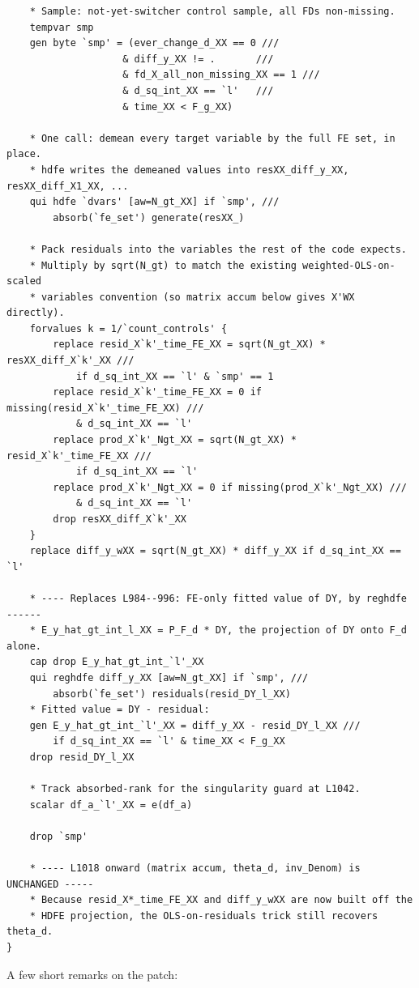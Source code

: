 \documentclass[11pt]{article}
\newcommand{\1}{\mathbb{1}}
\begin{document}
\begin{lstlisting}
    * Sample: not-yet-switcher control sample, all FDs non-missing.
    tempvar smp
    gen byte `smp' = (ever_change_d_XX == 0 ///
                    & diff_y_XX != .       ///
                    & fd_X_all_non_missing_XX == 1 ///
                    & d_sq_int_XX == `l'   ///
                    & time_XX < F_g_XX)

    * One call: demean every target variable by the full FE set, in place.
    * hdfe writes the demeaned values into resXX_diff_y_XX, resXX_diff_X1_XX, ...
    qui hdfe `dvars' [aw=N_gt_XX] if `smp', ///
        absorb(`fe_set') generate(resXX_)

    * Pack residuals into the variables the rest of the code expects.
    * Multiply by sqrt(N_gt) to match the existing weighted-OLS-on-scaled
    * variables convention (so matrix accum below gives X'WX directly).
    forvalues k = 1/`count_controls' {
        replace resid_X`k'_time_FE_XX = sqrt(N_gt_XX) * resXX_diff_X`k'_XX ///
            if d_sq_int_XX == `l' & `smp' == 1
        replace resid_X`k'_time_FE_XX = 0 if missing(resid_X`k'_time_FE_XX) ///
            & d_sq_int_XX == `l'
        replace prod_X`k'_Ngt_XX = sqrt(N_gt_XX) * resid_X`k'_time_FE_XX ///
            if d_sq_int_XX == `l'
        replace prod_X`k'_Ngt_XX = 0 if missing(prod_X`k'_Ngt_XX) ///
            & d_sq_int_XX == `l'
        drop resXX_diff_X`k'_XX
    }
    replace diff_y_wXX = sqrt(N_gt_XX) * diff_y_XX if d_sq_int_XX == `l'

    * ---- Replaces L984--996: FE-only fitted value of DY, by reghdfe ------
    * E_y_hat_gt_int_l_XX = P_F_d * DY, the projection of DY onto F_d alone.
    cap drop E_y_hat_gt_int_`l'_XX
    qui reghdfe diff_y_XX [aw=N_gt_XX] if `smp', ///
        absorb(`fe_set') residuals(resid_DY_l_XX)
    * Fitted value = DY - residual:
    gen E_y_hat_gt_int_`l'_XX = diff_y_XX - resid_DY_l_XX ///
        if d_sq_int_XX == `l' & time_XX < F_g_XX
    drop resid_DY_l_XX

    * Track absorbed-rank for the singularity guard at L1042.
    scalar df_a_`l'_XX = e(df_a)

    drop `smp'

    * ---- L1018 onward (matrix accum, theta_d, inv_Denom) is UNCHANGED -----
    * Because resid_X*_time_FE_XX and diff_y_wXX are now built off the
    * HDFE projection, the OLS-on-residuals trick still recovers theta_d.
}
\end{lstlisting}

\noindent
A few short remarks on the patch:
\end{document}
